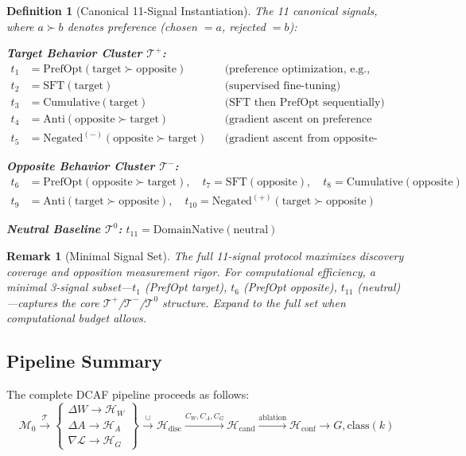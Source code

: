 \documentclass[11pt]{article}
\newtheorem{definition}{Definition}[section]
\newtheorem{remark}{Remark}[section]
\begin{document}
\begin{definition}[Canonical 11-Signal Instantiation]
\label{def:canonical-signals}
The 11 canonical signals, where $a \succ b$ denotes preference (chosen $= a$, rejected $= b$):

\textbf{Target Behavior Cluster $\mathcal{T}^+$:}
\begin{align*}
t_1 &= \text{PrefOpt}(\text{target} \succ \text{opposite}) & &\text{(preference optimization, e.g., SimPO, DPO)} \\
t_2 &= \text{SFT}(\text{target}) & &\text{(supervised fine-tuning)} \\
t_3 &= \text{Cumulative}(\text{target}) & &\text{(SFT then PrefOpt sequentially)} \\
t_4 &= \text{Anti}(\text{opposite} \succ \text{target}) & &\text{(gradient ascent on preference margin from base)} \\
t_5 &= \text{Negated}^{(-)}(\text{opposite} \succ \text{target}) & &\text{(gradient ascent from opposite-checkpoint)}
\end{align*}

\textbf{Opposite Behavior Cluster $\mathcal{T}^-$:}
\begin{align*}
t_6 &= \text{PrefOpt}(\text{opposite} \succ \text{target}), \quad t_7 = \text{SFT}(\text{opposite}), \quad t_8 = \text{Cumulative}(\text{opposite}) \\
t_9 &= \text{Anti}(\text{target} \succ \text{opposite}), \quad t_{10} = \text{Negated}^{(+)}(\text{target} \succ \text{opposite})
\end{align*}

\textbf{Neutral Baseline $\mathcal{T}^0$:} $t_{11} = \text{DomainNative}(\text{neutral})$
\end{definition}

\begin{remark}[Minimal Signal Set]
The full 11-signal protocol maximizes discovery coverage and opposition measurement rigor. For computational efficiency, a minimal 3-signal subset---$t_1$ (PrefOpt target), $t_6$ (PrefOpt opposite), $t_{11}$ (neutral)---captures the core $\mathcal{T}^+$/$\mathcal{T}^-$/$\mathcal{T}^0$ structure. Expand to the full set when computational budget allows.
\end{remark}

\subsection{Pipeline Summary}

The complete DCAF pipeline proceeds as follows:
\begin{equation}
\mathcal{M}_0 \xrightarrow{\mathcal{T}} \begin{Bmatrix} \Delta W \to \mathcal{H}_W \\ \Delta A \to \mathcal{H}_A \\ \nabla \mathcal{L} \to \mathcal{H}_G \end{Bmatrix} \xrightarrow{\cup} \mathcal{H}_{\text{disc}} \xrightarrow{C_W, C_A, C_G} \mathcal{H}_{\text{cand}} \xrightarrow{\text{ablation}} \mathcal{H}_{\text{conf}} \to G, \text{class}(k)
\end{equation}
\end{document}
